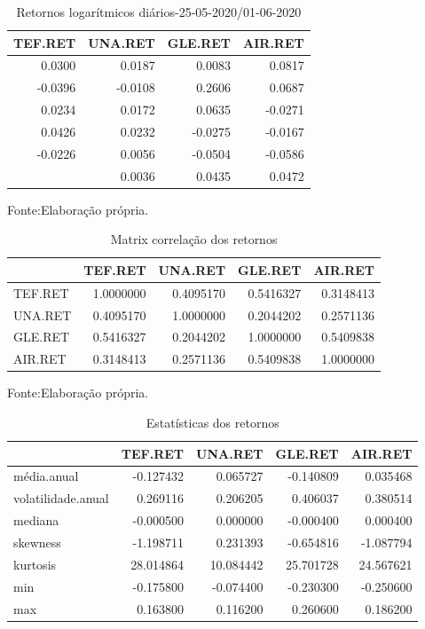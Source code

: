 \documentclass[
  12pt,
  a4paper,
  openany]{book}
\begin{document}
\justifying
\bigskip
\begin{table}[!h]

\caption{\label{tab:unnamed-chunk-7}Retornos logarítmicos diários-25-05-2020/01-06-2020}
\centering
\begin{tabular}[t]{rrrr}
\toprule
TEF.RET & UNA.RET & GLE.RET & AIR.RET\\
\midrule
0.0300 & 0.0187 & 0.0083 & 0.0817\\
-0.0396 & -0.0108 & 0.2606 & 0.0687\\
0.0234 & 0.0172 & 0.0635 & -0.0271\\
0.0426 & 0.0232 & -0.0275 & -0.0167\\
-0.0226 & 0.0056 & -0.0504 & -0.0586\\
\addlinespace
0.0368 & 0.0036 & 0.0435 & 0.0472\\
\bottomrule
\end{tabular}
\end{table}
\FloatBarrier
\centering

Fonte:Elaboração própria.

\justifying
\bigskip
\begin{table}[!h]

\caption{\label{tab:unnamed-chunk-8}Matrix correlação dos retornos}
\centering
\begin{tabular}[t]{lrrrr}
\toprule
  & TEF.RET & UNA.RET & GLE.RET & AIR.RET\\
\midrule
TEF.RET & 1.0000000 & 0.4095170 & 0.5416327 & 0.3148413\\
UNA.RET & 0.4095170 & 1.0000000 & 0.2044202 & 0.2571136\\
GLE.RET & 0.5416327 & 0.2044202 & 1.0000000 & 0.5409838\\
AIR.RET & 0.3148413 & 0.2571136 & 0.5409838 & 1.0000000\\
\bottomrule
\end{tabular}
\end{table}
\FloatBarrier
\centering

Fonte:Elaboração própria.

\justifying
\bigskip
\begin{table}[!h]

\caption{\label{tab:unnamed-chunk-9}Estatísticas dos retornos}
\centering
\begin{tabular}[t]{lrrrr}
\toprule
  & TEF.RET & UNA.RET & GLE.RET & AIR.RET\\
\midrule
média.anual & -0.127432 & 0.065727 & -0.140809 & 0.035468\\
volatilidade.anual & 0.269116 & 0.206205 & 0.406037 & 0.380514\\
mediana & -0.000500 & 0.000000 & -0.000400 & 0.000400\\
skewness & -1.198711 & 0.231393 & -0.654816 & -1.087794\\
kurtosis & 28.014864 & 10.084442 & 25.701728 & 24.567621\\
\addlinespace
min & -0.175800 & -0.074400 & -0.230300 & -0.250600\\
max & 0.163800 & 0.116200 & 0.260600 & 0.186200\\
\bottomrule
\end{tabular}
\end{table}
\FloatBarrier
\centering
\end{document}

